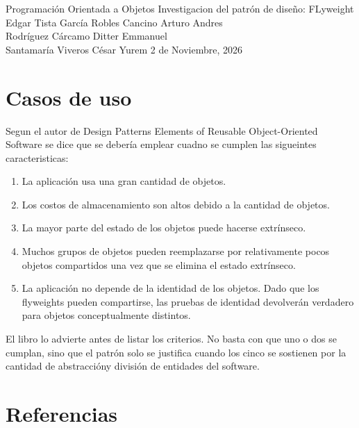\documentclass{article}
\begin{document}
\portadapractica
    {Programación Orientada a Objetos}
    {Investigacion del patrón de diseño: FLyweight}
    {Edgar Tista García}
    {Robles Cancino Arturo Andres\\
    Rodríguez Cárcamo Ditter Emmanuel\\
    Santamaría Viveros César Yurem}
    {2 de Noviembre, 2026}

\section{Casos de uso}
Segun el autor de Design Patterns Elements of Reusable Object-Oriented Software se dice que se debería emplear cuadno se cumplen las sigueintes caracteristicas:
\begin{enumerate}
    \item La aplicación usa una gran cantidad de objetos.
    \item Los costos de almacenamiento son altos debido a la cantidad de objetos.
    \item La mayor parte del estado de los objetos puede hacerse extrínseco.
    \item Muchos grupos de objetos pueden reemplazarse por relativamente pocos objetos compartidos una vez que se elimina el estado extrínseco.
    \item La aplicación no depende de la identidad de los objetos. Dado que los flyweights pueden compartirse, las pruebas de identidad devolverán verdadero para objetos conceptualmente distintos.
\end{enumerate}
El libro lo advierte antes de listar los criterios. No basta con que uno o dos se cumplan, sino que el patrón solo se justifica cuando los cinco se sostienen por la cantidad de abstraccióny división de entidades del software.

\section*{Referencias}
\nocite{*}
\printbibliography[heading=none]
\end{document}
